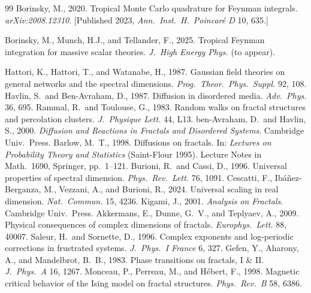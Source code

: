 \documentclass[11pt,a4paper]{article}
\theoremstyle{plain}
\begin{document}
\begin{thebibliography}{99}
 Borinsky, M., 2020. Tropical Monte Carlo quadrature for Feynman integrals. \textit{arXiv:2008.12310}. [Published 2023, \textit{Ann.\ Inst.\ H.\ Poincar\'e D} 10, 635.]

 Borinsky, M., Munch, H.J., and Tellander, F., 2025. Tropical Feynman integration for massive scalar theories. \textit{J.\ High Energy Phys.} (to appear).

 Hattori, K., Hattori, T., and Watanabe, H., 1987. Gaussian field theories on general networks and the spectral dimensions. \textit{Prog.\ Theor.\ Phys.\ Suppl.} 92, 108.
 Havlin, S.\ and Ben-Avraham, D., 1987. Diffusion in disordered media. \textit{Adv.\ Phys.} 36, 695.
 Rammal, R.\ and Toulouse, G., 1983. Random walks on fractal structures and percolation clusters. \textit{J.\ Physique Lett.} 44, L13.
 ben-Avraham, D.\ and Havlin, S., 2000. \textit{Diffusion and Reactions in Fractals and Disordered Systems}. Cambridge Univ.\ Press.
 Barlow, M.~T., 1998. Diffusions on fractals. In: \textit{Lectures on Probability Theory and Statistics} (Saint-Flour 1995). Lecture Notes in Math.\ 1690, Springer, pp.\ 1--121.
 Burioni, R.\ and Cassi, D., 1996. Universal properties of spectral dimension. \textit{Phys.\ Rev.\ Lett.} 76, 1091.
 Cescatti, F., Ib\'a\~nez-Berganza, M., Vezzani, A., and Burioni, R., 2024. Universal scaling in real dimension. \textit{Nat.\ Commun.} 15, 4236.
 Kigami, J., 2001. \textit{Analysis on Fractals}. Cambridge Univ.\ Press.
 Akkermans, E., Dunne, G.~V., and Teplyaev, A., 2009. Physical consequences of complex dimensions of fractals. \textit{Europhys.\ Lett.} 88, 40007.
 Saleur, H.\ and Sornette, D., 1996. Complex exponents and log-periodic corrections in frustrated systems. \textit{J.\ Phys.\ I France} 6, 327.
 Gefen, Y., Aharony, A., and Mandelbrot, B.~B., 1983. Phase transitions on fractals, I \& II. \textit{J.\ Phys.\ A} 16, 1267.
 Monceau, P., Perreau, M., and H\'ebert, F., 1998. Magnetic critical behavior of the Ising model on fractal structures. \textit{Phys.\ Rev.\ B} 58, 6386.

\end{thebibliography}
\end{document}
